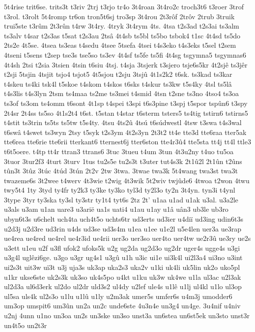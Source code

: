 {5t4rise
trit6se.
trits3t
t3riv
2trj
t3rjo
tr4o
3t4roan
3t4ro2c
troch3t6
t3roer
3trof
t3rol.
t3rolt
5t4romp
tr6on
tron5t6sj
tro3sp
3t4rou
2t3rôf
2trôv
2trub
3truik
trui5ste
t3rûm
2t3rûn
t4rw
3t4ry.
4tryk
3t4rym
4ts.
4tsa
t2s3ad
t2s3ai
ts3alm
ts3alv
t4sar
t2s3as
t5sat
t2s3au
2tsâ
4t4sb
ts5bl
ts5bo
tsbok4
t1sc
4t4sd
ts5do
2ts2e
4t5se.
4tsea
ts3eas
t4sedu
4tsee
5tsefa
4tsei
t4s3eko
t4s3eks
t5sel
t2sem
4tseni
t5sens
t2sep
tse3s
tse5so
ts3ev
4t4sf
ts5fe
ts5fi
4t4sg
tsgymna5
tsgymnas6
4t4sh
2tsi
t2sia
3tsien
4tsin
t6siu
4tsj.
t4sja
3tsjerk
t3sjero
tsje6s5kr
4t2sjê
ts3jêr
t2sji
5tsjin
4tsjit
tsjo4
tsjot5
4t5sjou
t2sju
3tsjû
4t1s2k2
t6sk.
ts3kad
ts3kar
t4skeu
ts4ki
tsk4l
t5skoe
t4skom
t4skos
t6sks
t4skur
ts3kw
t5s4ky
4tsl
ts5lâ
t4s3lis
t4s3lyn
2tsm
ts4maa
ts2me
ts3mei
t4smid
4tsn
t2sne
ts3no
4tso4
ts3oa
ts3of
ts3om
ts4omm
t6sont
4t1sp
t4spei
t3spi
t6s3pine
t3spj
t5spor
tspûn6
t3spy
2t4sr
2t4ss
ts5so
4t1s2t4
t6st.
t5stan
t4star
t6sterm
tsters5
ts4tig
tstirn6
tstirns5
t4stit
ts3trin
ts5ts
ts5tw
t5s4ty.
4tsu
4ts2û
4tsú
t6súdwestl
4tsw
t3swa
t4s3wal
t6swâ
t4swet
ts3wyn
2tsy
t5syk
t2s3ym
4t2s3yn
2t3t2
tt4e
tte3d
tte6raa
tter5ak
tte6rea
tte6rie
tte6rii
tterkant6
tternest6j
tter6ston
tte4r3û4
tte5sta
tt4j
tt4l
ttle3
t6t5oere.
t4tp
tt4r
ttran3
ttrans6
3tuc
3tueu
t4um
3tun
4t3u2ny
t4uo
tu5oa
3tuor
3tur2f3
4turt
3turv
1tus
tu2s5e
tu2s3t
t3uter
tut4s3k
2t1û2l
2t1ûn
t2ûns
tûn3t
3tûz
3túc
4túd
3tún
2t2v
2tw
3twa.
3twae
twa3k
5t4wang
twa3st
twa3t
twazeme6s
3t2wee
t4werv
4t3wie
t2wig
4t3wik
5t2wiv
twjûde6
4twoa
t2won
4twu
twy5t4
1ty
3tyd
ty4fr
ty2k3
ty3ke
ty3ko
tyl3d
ty2l3o
ty2n
3t4yn.
tyn3i
t4ynl
3type
3tyr
ty3ska
ty3sl
ty3str
ty1t4
tyt6s
2tz
2t'
u1aa
u1ad
u1ak
u3al.
u3a2le
u3als
u3am
u1an
uare3
u3arië
ua1s
uati4
u1au
u1ay
u1â
uân3
ub3le
ub3ro
ubyn6t3s
u6chelt
uch4ta
uch4t5o
uchts6tr
ud3erts
ud3ier
u4diï
ud3ing
udin6t3s
u2d3j
u2d3re
ud3rin
u4ds
ud3se
ud3s4m
u1ea
u1ee
u1e2l
u5e4len
uer3a
ue3rap
ue4rea
ue4red
ue4rel
ue4r3id
ue4rii
uer3o
uer3so
uer4to
uer4tw
ue2r3û
ue3ry
ue2s
u3ett
u1eu
u2f
u3fl
ufok2
ufoks5k
u2g
ug2da
ug2d3o
ug2dr
uger4s
ugge4s
u3gi
u3g4l
uglêzi6ge.
u3go
u3gr
ug4s1
u3gû
u1h
u3ic
ui1e
ui3k4l
ui2l3a4
ui3no
u3int
ui2s3t
uit3w
uï3t
u3j
uja3s
uk3ap
uka2s3
uka2v
u1ki
uk4li
uk5lin
uk2o
uko5pl
u1kr
ukse6ste
uk2s3k
uk3so
uk4s5po
u4kt
u1ku
uk3w
uk4we
u1la
ul3ac
u2l3ak
ul2d3a
ul6d3erk
ul2do
ul2dr
uld3s2
ul4dy
u2lef
ule4s
u1lê
u1lj
ul4kl
u1lo
ul3op
ul5sa
uls4k
ul2s3o
u1lu
u1lû
u1ly
u2m3ak
umer5s
umfer6s
u4m3j
umodder6
um3op
umspit6
um3ûn
un2a
un2c
unde6ste
4u3n4e
un3g4
un4ge.
3u4nif
u4niv
u2nj
4unn
u1no
un3oa
un2s
un3ske
un3so
unst3a
un6stea
un6st5ek
un3sto
unst3r
un4t5o
un2t3r
}
